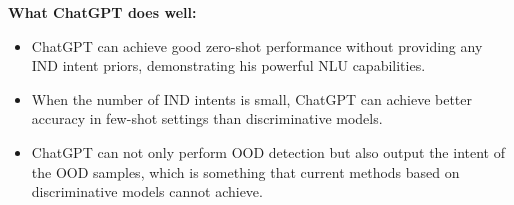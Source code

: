 \documentclass[10pt, a4paper]{article}
\begin{document}


\textbf{What ChatGPT does well:}
\begin{itemize}
[itemsep=4pt,topsep=0pt,parsep=0pt,leftmargin=9pt]
\item ChatGPT can achieve good zero-shot performance without providing any IND intent priors, demonstrating his powerful NLU capabilities.
\item When the number of IND intents is small, ChatGPT can achieve better accuracy  in few-shot settings than discriminative models.
\item ChatGPT can not only perform OOD detection but also output the intent of the OOD samples, which is something that current methods based on discriminative models cannot achieve.
\end{itemize}
\end{document}
